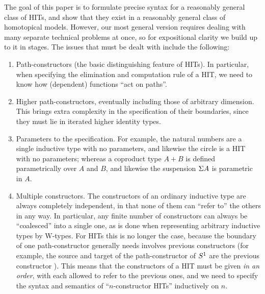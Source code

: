 \documentclass{amsart}
\begin{document}
The goal of this paper is to formulate precise syntax for a reasonably general class of HITs, and show that they exist in a reasonably general class of homotopical models.
However, our most general version requires dealing with many separate technical problems at once, so for expositional clarity we build up to it in stages.
The issues that must be dealt with include the following:
\begin{enumerate}
\item Path-constructors (the basic distinguishing feature of HITs).
  In particular, when specifying the elimination and computation rule of a HIT, we need to know how (dependent) functions ``act on paths''.\label{item:issue:ap}
\item Higher path-constructors, eventually including those of arbitrary dimension.
  This brings extra complexity in the specification of their boundaries, since they must lie in iterated higher identity types.
\item Parameters to the specification.  For example, the natural numbers are a single inductive type with no parameters, and likewise the circle is a HIT with no parameters; whereas a coproduct type $A+B$ is defined parametrically over $A$ and $B$, and likewise the suspension $\Sigma A$ is parametric in $A$.
\item Multiple constructors.
  The constructors of an ordinary inductive type are always completely independent, in that none of them can ``refer to'' the others in any way.
  In particular, any finite number of constructors can always be ``coalesced'' into a single one, as is done when representing arbitrary inductive types by W-types.
  For HITs this is no longer the case, because the boundary of one path-constructor generally needs involves previous constructors (for example, the source and target of the path-constructor \floop of $S^1$ are the previous constructor \fbase).
  This means that the constructors of a HIT must be given \emph{in an order}, with each allowed to refer to the previous ones, and we need to specify the syntax and semantics of ``$n$-constructor HITs'' inductively on $n$.


\end{enumerate}
\end{document}
